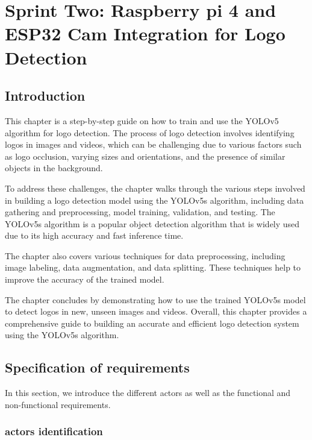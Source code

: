 %



%



\chapter{Sprint Two: Raspberry pi 4 and ESP32 Cam Integration for Logo Detection}
\section{Introduction}
This chapter is a step-by-step guide on how to train and use the YOLOv5 algorithm for logo detection. The process of logo detection involves identifying logos in images and videos, which can be challenging due to various factors such as logo occlusion, varying sizes and orientations, and the presence of similar objects in the background.

To address these challenges, the chapter walks through the various steps involved in building a logo detection model using the YOLOv5s algorithm, including data gathering and preprocessing, model training, validation, and testing. The YOLOv5s algorithm is a popular object detection algorithm that is widely used due to its high accuracy and fast inference time.

The chapter also covers various techniques for data preprocessing, including image labeling, data augmentation, and data splitting. These techniques help to improve the accuracy of the trained model.

The chapter concludes by demonstrating how to use the trained YOLOv5s model to detect logos in new, unseen images and videos. Overall, this chapter provides a comprehensive guide to building an accurate and efficient logo detection system using the YOLOv5s algorithm.
\section{Specification of requirements}
In this section, we introduce the different actors as well as the functional and non-functional requirements.
\subsection{actors identification }
